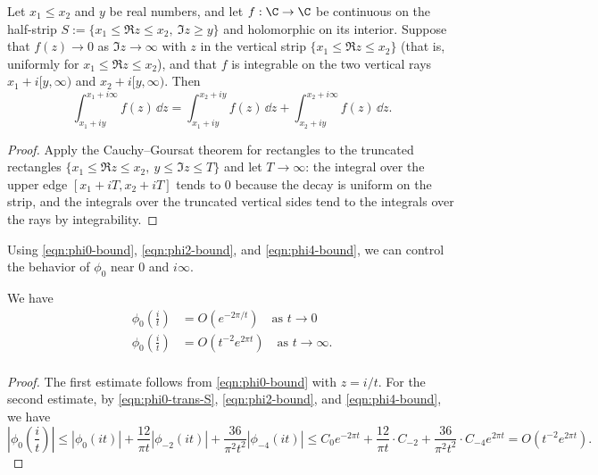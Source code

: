 \begin{lemma}\label{lem:CG-unbounded}\leanok\mathlibok
Let $x_1 \leq x_2$ and $y$ be real numbers, and let $f : \C \to \C$ be continuous on the half-strip $S := \{x_1 \leq \Re z \leq x_2,\ \Im z \geq y\}$ and holomorphic on its interior. Suppose that $f(z) \to 0$ as $\Im z \to \infty$ with $z$ in the vertical strip $\{x_1 \leq \Re z \leq x_2\}$ (that is, uniformly for $x_1 \leq \Re z \leq x_2$), and that $f$ is integrable on the two vertical rays $x_1 + i[y, \infty)$ and $x_2 + i[y, \infty)$. Then
\[
    \int_{x_1 + iy}^{x_1 + i\infty} f(z)\, \dd z
    = \int_{x_1 + iy}^{x_2 + iy} f(z)\, \dd z + \int_{x_2 + iy}^{x_2 + i\infty} f(z)\, \dd z.
\]
\end{lemma}
\begin{proof}\leanok
Apply the Cauchy--Goursat theorem for rectangles to the truncated rectangles $\{x_1 \leq \Re z \leq x_2,\ y \leq \Im z \leq T\}$ and let $T \to \infty$: the integral over the upper edge $[x_1 + iT, x_2 + iT]$ tends to $0$ because the decay is uniform on the strip, and the integrals over the truncated vertical sides tend to the integrals over the rays by integrability.
\end{proof}

Using \eqref{eqn:phi0-bound}, \eqref{eqn:phi2-bound}, and \eqref{eqn:phi4-bound}, we can control the behavior of $\phi_0$ near $0$ and $i\infty$.

\begin{corollary}\label{cor:phi0-near-0-infty}\leanok
We have
\begin{align}
    \phi_0\left(\frac{i}{t}\right) &= O(e^{-2 \pi / t}) \quad \text{as } t \to 0 \label{eqn:phi0-near-0} \\
    \phi_0\left(\frac{i}{t}\right) &= O(t^{-2}e^{2 \pi t}) \quad \text{as } t \to \infty. \label{eqn:phi0-near-infty} \\
\end{align}
\end{corollary}
\begin{proof}
The first estimate follows from \eqref{eqn:phi0-bound} with $z = i/t$.
For the second estimate, by \eqref{eqn:phi0-trans-S}, \eqref{eqn:phi2-bound}, and \eqref{eqn:phi4-bound}, we have
\begin{equation}
    \left|\phi_0\left(\frac{i}{t}\right)\right| \le |\phi_0(it)| + \frac{12}{\pi t} |\phi_{-2}(it)| + \frac{36}{\pi^2 t^2} |\phi_{-4}(it)|
    \le C_0 e^{-2 \pi t} + \frac{12}{\pi t} \cdot C_{-2} + \frac{36}{\pi^2 t^2} \cdot C_{-4} e^{2 \pi t} = O(t^{-2}e^{2 \pi t}).
\end{equation}
\end{proof}

